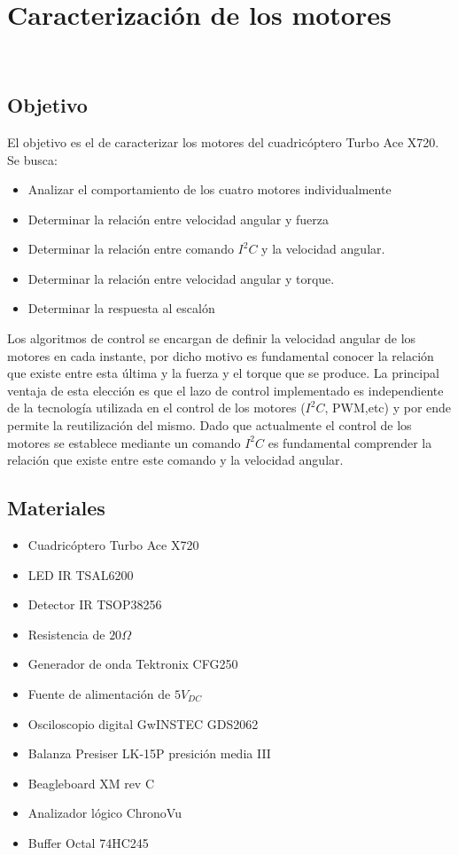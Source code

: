 \documentclass[main]{subfiles}
\begin{document}
\chapter{Caracterizaci\'on de los motores}\
\label{chap:test_motores}
\section{Objetivo}
El objetivo es el de caracterizar los motores del cuadric\'optero Turbo Ace X720. Se busca:

\begin{itemize}
\item Analizar el comportamiento de los cuatro motores individualmente
\item Determinar la relaci\'on entre velocidad angular y fuerza
\item Determinar la relaci\'on entre comando $I^2C$ y la velocidad angular.
\item Determinar la relaci\'on entre velocidad angular y torque.
\item Determinar la respuesta al escal\'on
\end{itemize}

Los algoritmos de control se encargan de definir la velocidad angular de los motores en cada instante, por dicho motivo es fundamental conocer la relaci\'on que existe entre esta \'ultima y la fuerza y el torque que se produce. La principal ventaja de esta elecci\'on es que el lazo de control implementado es independiente de la tecnolog\'ia utilizada en el control de los motores ($I^2C$, PWM,etc) y por ende permite la reutilizaci\'on del mismo. Dado que actualmente el control de los motores se establece mediante un comando $I^2C$ es fundamental comprender la relaci\'on que existe entre este comando y la velocidad angular.

\section{Materiales}
\begin{itemize}
\item Cuadric\'optero Turbo Ace X720	
\item LED IR TSAL6200
\item Detector IR TSOP38256
\item Resistencia de $20 \Omega$
\item Generador de onda Tektronix CFG250
\item Fuente de alimentaci\'on de $5V_{DC}$
\item Osciloscopio digital GwINSTEC GDS2062
\item Balanza Presiser LK-15P presici\'on media III
\item Beagleboard XM rev C
\item Analizador l\'ogico ChronoVu
\item Buffer Octal 74HC245
\end{itemize}
\end{document}
